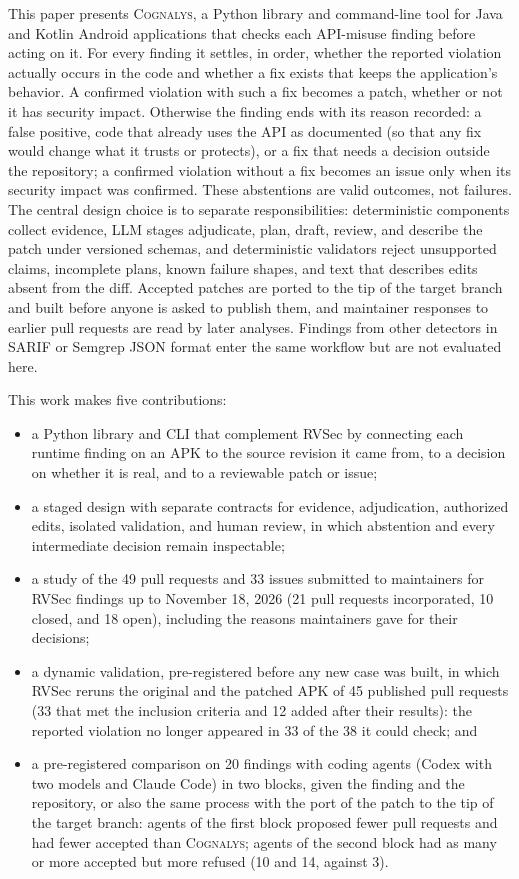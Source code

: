 \documentclass[conference]{IEEEtran}
\newcommand{\system}{\textsc{Cognalys}}
\begin{document}
This paper presents \system, a Python library and command-line tool for Java
and Kotlin Android applications that checks each API-misuse finding before
acting on it. For every finding it settles, in order, whether the reported
violation actually occurs in the code and whether a fix exists that keeps the
application's behavior. A confirmed violation with such a fix becomes a patch,
whether or not it has security impact. Otherwise the finding ends with its
reason recorded: a false positive, code that already uses the API as documented
(so that any fix would change what it trusts or protects), or a fix that needs
a decision outside the repository; a confirmed violation without a fix becomes
an issue only when its security impact was confirmed. These abstentions are
valid outcomes, not failures. The central design choice is to separate
responsibilities: deterministic components collect evidence, LLM stages
adjudicate, plan, draft, review, and describe the patch under versioned
schemas, and deterministic validators reject unsupported claims, incomplete
plans, known failure shapes, and text that describes edits absent from the
diff. Accepted patches are ported to the tip of the target branch and built
before anyone is asked to publish them, and maintainer responses to earlier
pull requests are read by later analyses. Findings from other detectors in
SARIF or Semgrep JSON format enter the same workflow but are not evaluated
here.

This work makes five contributions:
\begin{itemize}
  \item a Python library and CLI that complement RVSec by connecting each
  runtime finding on an APK to the source revision it came from, to a decision
  on whether it is real, and to a reviewable patch or issue;
  \item a staged design with separate contracts for evidence, adjudication,
  authorized edits, isolated validation, and human review, in which abstention
  and every intermediate decision remain inspectable;
  \item a study of the 49 pull requests and 33 issues submitted to maintainers
  for RVSec findings up to November 18, 2026 (21 pull requests incorporated, 10
  closed, and 18 open), including the reasons maintainers gave for their
  decisions;
  \item a dynamic validation, pre-registered before any new case was built, in
  which RVSec reruns the original and the patched APK of 45 published pull
  requests (33 that met the inclusion criteria and 12 added after their
  results): the reported violation no longer appeared in 33 of the 38 it could
  check; and
  \item a pre-registered comparison on 20 findings with coding agents (Codex
  with two models and Claude Code) in two blocks, given the finding and the
  repository, or also the same process with the port of the patch to the tip of
  the target branch: agents of the first block proposed fewer pull requests and
  had fewer accepted than \system{}; agents of the second block had as many or
  more accepted but more refused (10 and 14, against 3).
\end{itemize}
\end{document}
